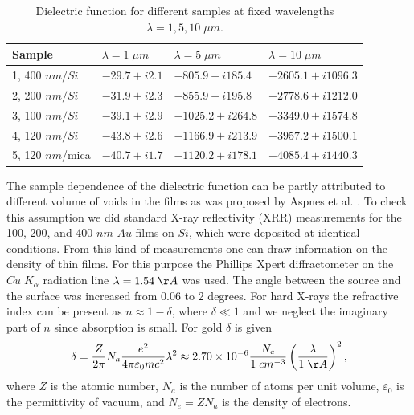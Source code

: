 \documentclass[prb]{revtex4}%
\begin{document}
\begin{table}
\centering
\begin{tabular}{l||l|l|l}
Sample & $\lambda=1\;\mu m$ & $\lambda=5\;\mu m$ & $\lambda=10\;\mu m$ \\
\hline\hline 1, 400 $nm/Si$ & $-29.7+i 2.1$ & $-805.9+i 185.4$ & $-2605.1+i 1096.3$ \\
   2, 200 $nm/Si$ & $-31.9+i 2.3$ & $-855.9+i 195.8$ & $-2778.6+i 1212.0$ \\
   3, 100 $nm/Si$ & $-39.1+i 2.9$ & $-1025.2+i 264.8$ & $-3349.0+i 1574.8$ \\
   4, 120 $nm/Si$ & $-43.8+i 2.6$ & $-1166.9+i 213.9$ & $-3957.2+i 1500.1$ \\
   5, 120 $nm$/mica & $-40.7+i 1.7$ & $-1120.2+i 178.1$ & $-4085.4+i 1440.3$

\end{tabular}
\caption{Dielectric function for different samples at fixed
wavelengths $\lambda=1,5,10\;\mu m$.}\label{tab1}
\end{table}

\bigskip
The sample dependence of the dielectric function can be partly
attributed to different volume of voids in the films as was proposed
by Aspnes et al. \cite{Asp80}. To check this assumption we did
standard X-ray reflectivity (XRR) measurements
\cite{Sin88,Bra88,Als91} for the 100, 200, and 400 $nm$ $Au$ films
on $Si$, which were deposited at identical conditions. From this
kind of measurements one can draw information on the density of thin
films. For this purpose the Phillips Xpert diffractometer on the
$Cu\; K_{\alpha}$ radiation line $\lambda=1.54\;{\AA}$ was used. The
angle between the source and the surface was increased from 0.06 to
2 degrees. For hard X-rays the refractive index can be present as
$n\approx1-\delta$, where $\delta\ll 1$ and we neglect the imaginary
part of $n$ since absorption is small. For gold $\delta$ is given
%
\begin{equation}
\delta=\frac{Z}{2\pi}N_a\frac{e^2}{4\pi\varepsilon_0
mc^2}\lambda^2\approx
2.70\times10^{-6}\frac{N_e}{1\;cm^{-3}}\left(\frac{\lambda}{1\;\AA}\right)^2,
\label{theta_c}
\end{equation}
%
where $Z$ is the atomic number, $N_a$ is the number of atoms per
unit volume, $\varepsilon_0$ is the permittivity of vacuum, and
$N_e=ZN_a$ is the density of electrons.
\end{document}
